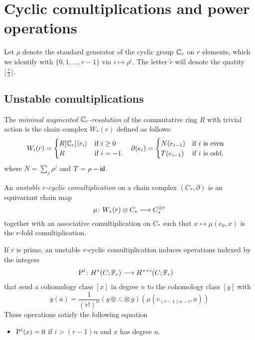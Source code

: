 
\section{Cyclic comultiplications and power operations} \label{s:2bcomultiplications}

Let $\rho$ denote the standard generator of the cyclic group $\mathbb{C}_r$ on $r$ elements, which we identify with $\{0,1,\ldots,r-1\}$ via $i\mapsto \rho^i$. The letter $\tilde{r}$ will denote the quatity $\lfloor \frac{r}{2} \rfloor$.

\subsection{Unstable comultiplications}

The \emph{minimal augmented $\mathbb{C}_r$-resolution} of the commutative ring $R$ with trivial action is the chain complex $W_*(r)$ defined as follows:
\begin{align*}
	W_i(r) &= \begin{cases}
		R[\mathbb{C}_r]\langle e_i\rangle & \text{if $i\geq 0$} \\
		R & \text{if $i=-1$}.
	\end{cases} &
	\partial(e_i) &= \begin{cases}
		N(e_{i-1}) & \text{if $i$ is even} \\
		T(e_{i-1}) & \text{if $i$ is odd,}
	\end{cases}
\end{align*}
where $N = \sum_j \rho^j$ and $T = \rho - \mathsf{id}$. %

An \emph{unstable $r$-cyclic comultiplication} on a chain complex $(C_*,\partial)$ is an equivariant chain map
\[\mu\colon W_*(r)\otimes C_*\longrightarrow C_*^{\otimes r}\]
together with an associative comultiplication on $C_*$ such that $x\mapsto \mu(e_0,x)$ is the $r$-fold comultiplication.
\begin{proposition}\label{prop:unstable}
	If $r$ is prime, an unstable $r$-cyclic comultiplication induces operations indexed by the integers
	\begin{align*}
		\operatorname{P}^{i}\colon H^*(C;\mathbb{F}_r)&\longrightarrow H^{*+i}(C;\mathbb{F}_r)
	\end{align*}
	that send a cohomology class $[x]$ in degree $n$ to the cohomology class $[y]$ with
	\[
	y(a) = \frac{1}{(\tilde{r}!)^n}(y\otimes \overset{r}{\ldots}\otimes y)(\mu(e_{(r-1)n-i},a))
	\]
	These operations satisfy the following equation
	\begin{itemize}
		\item $\operatorname{P}^i(x) = 0$ if $i>(r-1)n$ and $x$ has degree $n$.
	\end{itemize}
\end{proposition}

